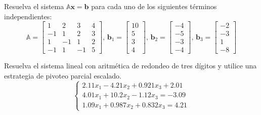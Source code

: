 \documentclass[11pt]{article}
\begin{document}
\begin{question} %
    Resuelva el sistema $\mathbb{A} \bm{x} = \bm{b}$ para cada uno de los siguientes términos independientes:
    \[ \mathbb{A} = \begin{bmatrix} 1 & 2 & 3 & 4 \\ -1 & 1 & 2 & 3 \\ 1 & -1 & 1 & 2 \\ -1 & 1 & -1 & 5 \end{bmatrix}, \, \bm{b}_1 = \begin{bmatrix} 10 \\ 5 \\ 3 \\ 4 \end{bmatrix}, \, \bm{b}_2 = \begin{bmatrix} -4 \\ -5 \\ -3 \\ -4 \end{bmatrix}, \, \bm{b}_3 = \begin{bmatrix} -2 \\ -3 \\ 1 \\ -8 \end{bmatrix} \]
\end{question}

\begin{question} %
Resuelva el sistema lineal con aritmética de redondeo de tres dígitos y utilice una estrategia de pivoteo parcial escalado.
\[ \begin{cases}
2.11 x_1 - 4.21 x_2 + 0.921 x_3 + 2.01 \\
4.01 x_1 + 10.2 x_2 - 1.12 x_3 = -3.09 \\
1.09 x_1 + 0.987 x_2 + 0.832 x_3 = 4.21
\end{cases} \]
\end{question}
\end{document}
